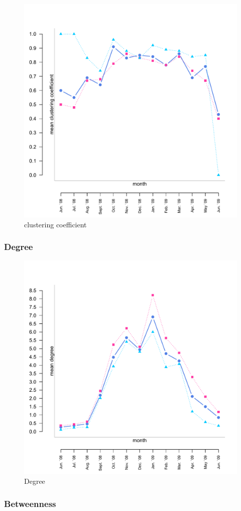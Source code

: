 \begin{figure}[htpb]
\begin{center}
  \includegraphics[width=.6\textwidth]{assets/pdf/long_cc.pdf}
  \caption[clustering coefficient]{clustering coefficient}
  \label{fig:long_cc}
\end{center}
\end{figure} 


\subsubsection*{Degree}

\begin{figure}[htpb]
\begin{center}
  \includegraphics[width=.6\textwidth]{assets/pdf/long_degree.pdf}
  \caption[Degree]{Degree}
  \label{fig:long_degree}
\end{center}
\end{figure} 


\subsubsection*{Betweenness}

